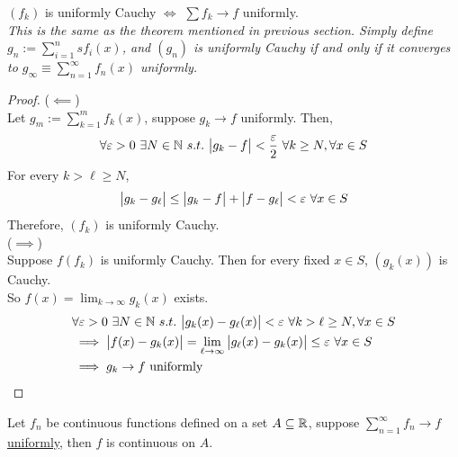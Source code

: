 \documentclass[11pt]{article}
\begin{document}
 	\begin{theorem}
 		$(f_k)$ is uniformly Cauchy $\iff$ $\sum f_k \to f$ uniformly. \\
 		\emph{This is the same as the theorem mentioned in previous section. Simply define $g_n := \sum_{i=1}^ns f_i(x)$, and $(g_n)$ is uniformly Cauchy if and only if it converges to $g_\infty \equiv \sum_{n=1}^\infty f_n(x)$ uniformly.}
 	\end{theorem}
 	\begin{proof}
 		($\impliedby$)\\
 		Let $g_m := \sum_{k=1}^m f_k(x)$, suppose $g_k \to f$ uniformly. Then, 
 		\begin{align}
 			\forall \varepsilon > 0\ \exists N \in \mathbb{N}\ s.t.\ \big \vert {g_k - f} \big \vert < \frac{\varepsilon}{2}\ \forall k \geq N, \forall x \in S
 		\end{align}
 		For every $k > \ell \geq N$,
 		\begin{align}
 			\big \vert {g_k - g_\ell} \big \vert \leq \big \vert {g_k - f} \big \vert + \big \vert {f - g_\ell} \big \vert < \varepsilon\ \forall x \in S
 		\end{align}
 		Therefore, $(f_k)$ is uniformly Cauchy. \\
 		($\implies$) \\
 		Suppose $f(f_k)$ is uniformly Cauchy. Then for every fixed $x \in S$, $(g_k(x))$ is Cauchy. \\
 		So $f(x) = \lim_{k \to \infty} g_k(x)$ exists.
 		\begin{align}
 			&\forall \varepsilon > 0\ \exists N \in \N\ s.t.\ \abs{g_k(x) - g_\ell(x)} < \varepsilon\ \forall k > \ell \geq N,\forall x \in S \\
 			&\implies \abs{f(x) - g_k(x)} = \lim_{\ell \to \infty} \abs{g_\ell(x) - g_k(x)} \leq \varepsilon\ \forall x \in S\\
 			&\implies g_k \to f \tx{ uniformly}
 		\end{align}
 	\end{proof}
 	
 	\begin{theorem}
 		Let $f_n$ be continuous functions defined on a set $A \subseteq \mathbb{R}$, suppose $\sum^\infty_{n=1} f_n \to f$ \ul{uniformly}, then $f$ is continuous on $A$.
 	\end{theorem}
 	
\end{document}
